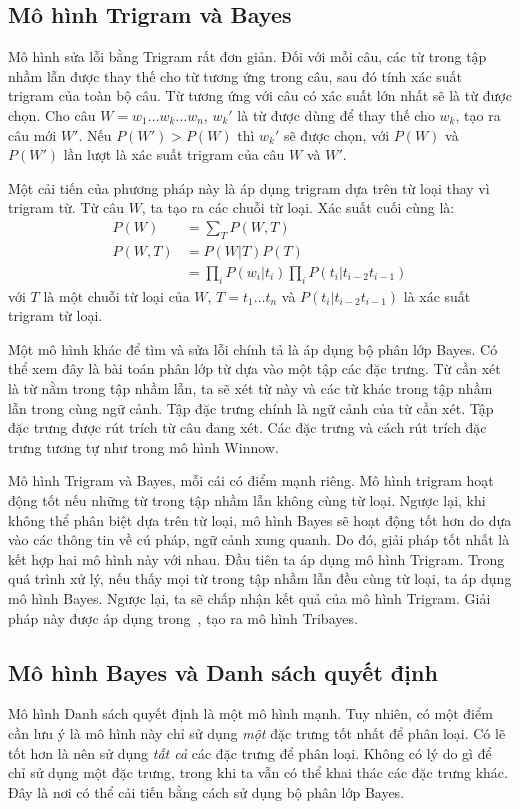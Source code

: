 \documentclass[a4paper,oneside,14pt]{extbook} %
\begin{document}
\subsection{Mô hình Trigram và Bayes}

Mô hình sửa lỗi bằng Trigram rất đơn giản. Đối với mỗi câu, các từ
trong tập nhầm lẫn được thay thế cho từ tương ứng trong câu, sau đó
tính xác suất trigram của toàn bộ câu. Từ tương ứng với câu có xác
suất lớn nhất sẽ là từ được chọn. Cho câu $W =
w_1\ldots{} w_k\ldots{} w_n$, $w_k'$ là từ được dùng để thay thế cho
$w_k$, tạo ra câu mới $W'$. Nếu $P(W') > P(W)$ thì $w_k'$ sẽ được
chọn, với $P(W)$ và $P(W')$ lần lượt là xác suất trigram của câu $W$
và $W'$.

Một cải tiến của phương pháp này là
áp dụng trigram dựa trên từ loại thay vì trigram từ. Từ câu $W$, ta
tạo ra các chuỗi từ loại. Xác suất cuối cùng là:
\begin{align*}
P(W)  &=\sum_T P(W,T)\\
P(W,T)&=P(W|T)P(T)\\
      &=\prod_i P(w_i|t_i)\prod_i P(t_i|t_{i-2}t_{i-1})
\end{align*}
với $T$ là một chuỗi từ loại của $W$, $T=t_1\ldots{} t_n$ và
$P(t_i|t_{i-2}t_{i-1})$ là xác suất trigram từ loại.

Một mô hình khác để tìm và sửa lỗi chính tả là áp dụng bộ phân lớp
Bayes. Có thể xem đây là bài toán phân lớp từ dựa vào một tập các đặc
trưng. Từ cần xét là từ nằm trong tập nhầm lẫn, ta sẽ xét từ này và
các từ khác trong tập nhầm lẫn trong cùng ngữ cảnh. Tập đặc trưng
chính là ngữ cảnh của từ cần xét. Tập đặc trưng được rút trích từ câu
đang xét. Các đặc trưng và cách rút trích đặc trưng tương tự như trong
mô hình Winnow.

Mô hình Trigram và Bayes, mỗi cái có điểm mạnh riêng. Mô hình trigram
hoạt động tốt nếu những từ trong tập nhầm lẫn không cùng từ
loại. Ngược lại, khi không thể phân biệt dựa trên từ loại, mô hình
Bayes sẽ hoạt động tốt hơn do dựa vào các thông tin về cú pháp, ngữ
cảnh xung quanh. Do đó, giải pháp tốt nhất là kết hợp hai mô hình này
với nhau. Đầu tiên ta áp dụng mô hình Trigram. Trong quá trình xử lý,
nếu thấy mọi từ trong tập nhầm lẫn đều cùng từ loại, ta áp dụng mô
hình Bayes. Ngược lại, ta sẽ chấp nhận kết quả của mô hình
Trigram. Giải pháp này được áp dụng trong~\cite{Golding96}, tạo ra mô
hình Tribayes.


\subsection{Mô hình Bayes và Danh sách quyết định}
Mô hình Danh sách quyết định là một mô hình mạnh. Tuy nhiên, có một
điểm cần lưu ý là mô hình này chỉ sử dụng {\em một} đặc trưng tốt nhất
để phân loại. Có lẽ tốt hơn là nên sử dụng {\em tất cả} các đặc trưng
để phân loại. Không có lý do gì để chỉ sử dụng một đặc trưng, trong
khi ta vẫn có thể khai thác các đặc trưng khác. Đây là nơi có thể cải
tiến bằng cách sử dụng bộ phân lớp Bayes.
\end{document}
